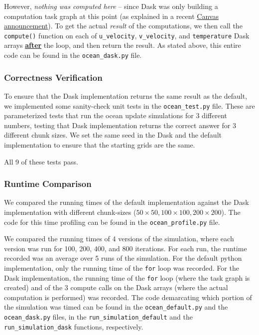 \documentclass[a4paper,12pt]{article}
\begin{document}
However, \textit{nothing was computed here} -- since Dask was only building a computation task graph at this point (as explained in a recent \href{https://canvas.kth.se/courses/52247/discussion_topics/452810}{Canvas announcement}). To get the actual \textit{result} of the computations, we then call the \verb|compute()| function on each of \verb|u_velocity|, \verb|v_velocity|, and \verb|temperature| Dask arrays \textbf{\underline{after}} the loop, and then return the result. As stated above, this entire code can be found in the \verb|ocean_dask.py| file.

\subsubsection{Correctness Verification}
To ensure that the Dask implementation returns the same result as the default, we implemented some sanity-check unit tests in the \verb|ocean_test.py| file. These are parameterized tests that run the ocean update simulations for 3 different numbers, testing that Dask implementation returns the correct answer for 3 different chunk sizes. We set the same seed in the Dask and the default implementation to ensure that the starting grids are the same. 

All 9 of these tests pass.

\subsubsection{Runtime Comparison}
We compared the running times of the default implementation against the Dask implementation with different chunk-sizes ($50 \times 50, 100 \times 100, 200 \times 200$). The code for this time profiling can be found in the \verb|ocean_profile.py| file. 

We compared the running times of 4 versions of the simulation, where each version was run for 100, 200, 400, and 800 iterations. For each run, the runtime recorded was an average over 5 runs of the simulation. For the default python implementation, only the running time of the \verb|for| loop was recorded. For the Dask implementation, the running time of the \verb|for| loop (where the task graph is created) and of the 3 compute calls on the Dask arrays (where the actual computation is performed) was recorded. The code demarcating which portion of the simulation was timed can be found in the \verb|ocean_default.py| and the \verb|ocean_dask.py| files, in the \verb|run_simulation_default| and the \verb|run_simulation_dask| functions, respectively.
\end{document}
